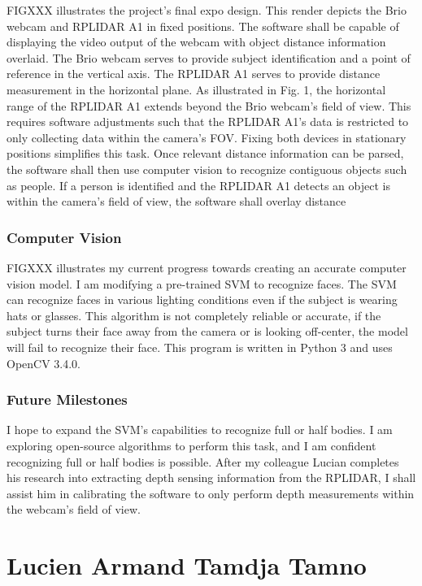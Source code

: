 \documentclass[onecolumn, draftclsnofoot,10pt, compsoc]{IEEEtran}
\begin{document}
\begin{singlespace}
			FIGXXX illustrates the project’s final expo design. This render depicts the Brio webcam and RPLIDAR A1 in fixed positions. The software shall be capable of displaying the video output of the webcam with object distance information overlaid. The Brio webcam serves to provide subject identification and a point of reference in the vertical axis. The RPLIDAR A1 serves to provide distance measurement in the horizontal plane. As illustrated in Fig. 1, the horizontal range of the RPLIDAR A1 extends beyond the Brio webcam’s field of view. This requires software adjustments such that the RPLIDAR A1’s data is restricted to only collecting data within the camera’s FOV. Fixing both devices in stationary positions simplifies this task. Once relevant distance information can be parsed, the software shall then use computer vision to recognize contiguous objects such as people. If a person is identified and the RPLIDAR A1 detects an object is within the camera’s field of view, the software shall overlay distance 
		
		\subsubsection{Computer Vision}
			FIGXXX illustrates my current progress towards creating an accurate computer vision model. I am modifying a pre-trained SVM to recognize faces. The SVM can recognize faces in various lighting conditions even if the subject is wearing hats or glasses. This algorithm is not completely reliable or accurate, if the subject turns their face away from the camera or is looking off-center, the model will fail to recognize their face. This program is written in Python 3 and uses OpenCV 3.4.0.

		\subsubsection{Future Milestones}
			I hope to expand the SVM’s capabilities to recognize full or half bodies. I am exploring open-source algorithms to perform this task, and I am confident recognizing full or half bodies is possible. After my colleague Lucian completes his research into extracting depth sensing information from the RPLIDAR, I shall assist him in calibrating the software to only perform depth measurements within the webcam’s field of view.


	\section{Lucien Armand Tamdja Tamno}
\end{singlespace}
\end{document}
